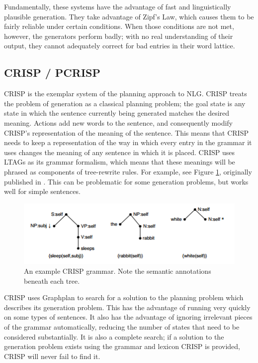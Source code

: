 Fundamentally, these systems have the advantage of
fast and linguistically plausible generation.  They
take advantage of Zipf's Law, which causes them
to be fairly reliable under certain conditions.  When
those conditions are not met, however, the generators perform
badly; with no real understanding of their output, they
cannot adequately correct for bad entries in their word
lattice.

\subsection{CRISP / PCRISP}

CRISP is the exemplar system of the planning approach to NLG.
CRISP treats the problem of generation as a classical planning
problem; the goal state is any state in which the sentence
currently being generated matches the desired meaning.
Actions add new words to the sentence, and consequently
modify CRISP's representation of the meaning of the sentence.
This means that CRISP needs to keep a representation of the
way in which every entry in the grammar it uses changes the
meaning of any sentence in which it is placed.
CRISP uses LTAGs as its grammar formalism,
which means that these meanings will be phrased as components
of tree-rewrite rules.  For example, see Figure \ref{crisp-grammar},
originally published in \cite{koller_experiences_2011}.
This can be problematic for some generation problems, but works well
for simple sentences.

\begin{figure}
\centering
\includegraphics{crisp-grammar.png}
\caption{An example CRISP grammar.  Note the semantic annotations
beneath each tree.}
\label{crisp-grammar}
\end{figure}

CRISP uses Graphplan to search for a solution to the planning
problem which describes its generation problem.  This has
the advantage of running very quickly on some types of
sentences.  It also has the advantage of ignoring irrelevant
pieces of the grammar automatically, reducing the number
of states that need to be considered substantially.
It is also a complete search; if a solution to the generation
problem exists using the grammar and lexicon CRISP is provided,
CRISP will never fail to find it.

